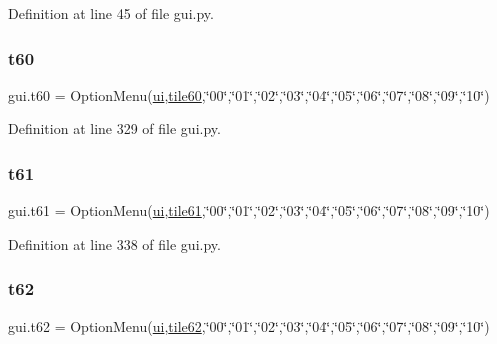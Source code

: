 Definition at line 45 of file gui.\+py.

\mbox{\label{namespacegui_a3cd5c6177361d8c96b000f4b6f2f7ce4}} 
\subsubsection{\texorpdfstring{t60}{t60}}
{\footnotesize\ttfamily gui.\+t60 = Option\+Menu(\mbox{\hyperlink{namespacegui_a40ab7281456eadbea2dc2038f5c24fa1}{ui}},\mbox{\hyperlink{namespacegui_ab03da7520cb8fba94a7355a29961a27c}{tile60}},\char`\"{}00\char`\"{},\char`\"{}01\char`\"{},\char`\"{}02\char`\"{},\char`\"{}03\char`\"{},\char`\"{}04\char`\"{},\char`\"{}05\char`\"{},\char`\"{}06\char`\"{},\char`\"{}07\char`\"{},\char`\"{}08\char`\"{},\char`\"{}09\char`\"{},\char`\"{}10\char`\"{})}



Definition at line 329 of file gui.\+py.

\mbox{\label{namespacegui_ae908e57760921433263e34773bc540d7}} 
\subsubsection{\texorpdfstring{t61}{t61}}
{\footnotesize\ttfamily gui.\+t61 = Option\+Menu(\mbox{\hyperlink{namespacegui_a40ab7281456eadbea2dc2038f5c24fa1}{ui}},\mbox{\hyperlink{namespacegui_a72aee8d939c765161a5aae9a00f1eaa9}{tile61}},\char`\"{}00\char`\"{},\char`\"{}01\char`\"{},\char`\"{}02\char`\"{},\char`\"{}03\char`\"{},\char`\"{}04\char`\"{},\char`\"{}05\char`\"{},\char`\"{}06\char`\"{},\char`\"{}07\char`\"{},\char`\"{}08\char`\"{},\char`\"{}09\char`\"{},\char`\"{}10\char`\"{})}



Definition at line 338 of file gui.\+py.

\mbox{\label{namespacegui_acc0870790aeda4948db20409ee4f73c1}} 
\subsubsection{\texorpdfstring{t62}{t62}}
{\footnotesize\ttfamily gui.\+t62 = Option\+Menu(\mbox{\hyperlink{namespacegui_a40ab7281456eadbea2dc2038f5c24fa1}{ui}},\mbox{\hyperlink{namespacegui_a13b3be2d7f981617df137af52770951f}{tile62}},\char`\"{}00\char`\"{},\char`\"{}01\char`\"{},\char`\"{}02\char`\"{},\char`\"{}03\char`\"{},\char`\"{}04\char`\"{},\char`\"{}05\char`\"{},\char`\"{}06\char`\"{},\char`\"{}07\char`\"{},\char`\"{}08\char`\"{},\char`\"{}09\char`\"{},\char`\"{}10\char`\"{})}



